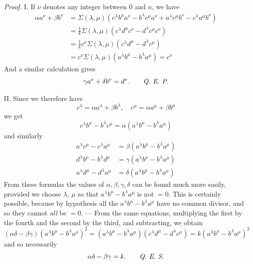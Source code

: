 \textit{Proof.} I. If $\nu$ denotes any integer between $0$ and $n$, we have
\[
\begin{aligned}
\alpha a^\nu+\beta b^\nu
&=\Sigma(\lambda,\mu)(c^\lambda b^\mu a^\nu-b^\lambda c^\mu a^\nu+a^\lambda c^\mu b^\nu-c^\lambda a^\mu b^\nu)\\
&=\frac1k\Sigma(\lambda,\mu)(c^\lambda d^\mu c^\nu-d^\lambda c^\mu c^\nu)\\
&=\frac1k c^\nu\Sigma(\lambda,\mu)(c^\lambda d^\mu-d^\lambda c^\mu)\\
&=c^\nu\Sigma(\lambda,\mu)(a^\lambda b^\mu-b^\lambda a^\mu)=c^\nu
\end{aligned}
\]
And a similar calculation gives
\[
\gamma a^\nu+\delta b^\nu=d^\nu.\qquad\text{\textit{Q. E. P.}}
\]

II. Since we therefore have
\[
c^\lambda=\alpha a^\lambda+\beta b^\lambda,\quad c^\mu=\alpha a^\mu+\beta b^\mu
\]
we get
\[
c^\lambda b^\mu-b^\lambda c^\mu=\alpha(a^\lambda b^\mu-b^\lambda a^\mu)
\]
and similarly
\[
\begin{aligned}
a^\lambda c^\mu-c^\lambda a^\mu&=\beta(a^\lambda b^\mu-b^\lambda a^\mu)\\
d^\lambda b^\mu-b^\lambda d^\mu&=\gamma(a^\lambda b^\mu-b^\lambda a^\mu)\\
a^\lambda d^\mu-d^\lambda a^\mu&=\delta(a^\lambda b^\mu-b^\lambda a^\mu)
\end{aligned}
\]
From these formulas the values of $\alpha,\beta,\gamma,\delta$ can be found much more easily, provided we choose $\lambda$, $\mu$ so that $a^\lambda b^\mu-b^\lambda a^\mu$ is not $=0$. This is certainly possible, because by hypothesis all the $a^\lambda b^\mu-b^\lambda a^\mu$ have no common divisor, and so they cannot \textit{all} be $=0$. --- From the same equations, multiplying the first by the fourth and the second by the third, and subtracting, we obtain
\[
(\alpha\delta-\beta\gamma)(a^\lambda b^\mu-b^\lambda a^\mu)^2
=(a^\lambda b^\mu-b^\lambda a^\mu)(c^\lambda d^\mu-d^\lambda c^\mu)
=k(a^\lambda b^\mu-b^\lambda a^\mu)^2
\]
and so necessarily
\[
\alpha\delta-\beta\gamma=k.\qquad\text{\textit{Q. E. S.}}
\]
